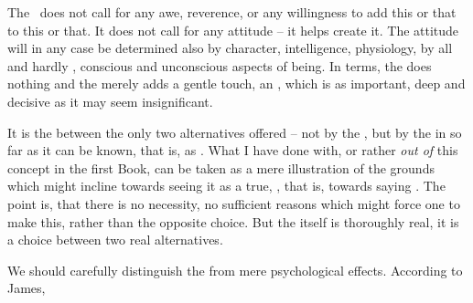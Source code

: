 The \sch\ does not call for any awe, reverence, or any willingness to
add this or that to this or that. It does not call for any attitude -- 
it helps create it. The  attitude will in any case be 
determined also by  character,  intelligence,  
physiology, by all  and hardly , conscious 
and 
unconscious aspects of  being. In  terms, the  
does nothing and the  merely adds a gentle touch, an 
, which is as important, deep and decisive as it 
may seem insignificant.

It is the  between the only
two alternatives offered -- not by the , but by the
 in so far as it can be known, that is, as .  What I have done with, or rather {\em out of}
this concept in the first Book, can be taken as a mere illustration of
the grounds which might incline  towards seeing it as a true,
, that is, towards saying \yes.  The
point is, that there is no necessity, no sufficient reasons which
might force one to make this, rather than the opposite choice. But 
the  itself is thoroughly real, it is a choice between two 
real alternatives. 

\pa We should carefully distinguish the  from mere
psychological effects.  According to James,  

